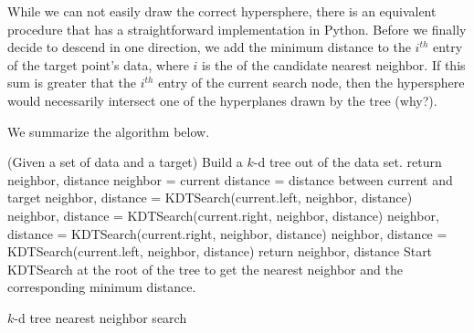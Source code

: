 While we can not easily draw the correct hypersphere, there is an equivalent procedure that has a straightforward implementation in Python.
Before we finally decide to descend in one direction, we add the minimum distance to the $i^{th}$ entry of the target point's data, where $i$ is the  of the candidate nearest neighbor.
If this sum is greater that the $i^{th}$ entry of the current search node, then the hypersphere would necessarily intersect one of the hyperplanes drawn by the tree (why?).

We summarize the algorithm below.

\begin{algorithm}[h] %
\begin{algorithmic}[1]
\State (Given a set of data and a target)
\State Build a $k$-d tree out of the data set.
    \State return neighbor, distance
\EndIf
		\State neighbor = current
		\State distance = distance between current and target
	\EndIf
    	\State neighbor, distance = KDTSearch(current.left, neighbor, distance)
    		\State neighbor, distance = KDTSearch(current.right, neighbor, distance)
    	\EndIf
    	\State neighbor, distance = KDTSearch(current.right, neighbor, distance)
    		\State neighbor, distance = KDTSearch(current.left, neighbor, distance)
    	\EndIf
    \EndIf
\State return neighbor, distance
\EndProcedure
\State Start KDTSearch at the root of the tree to get the nearest neighbor and the corresponding minimum distance.
\end{algorithmic}
\caption{$k$-d tree nearest neighbor search}
\label{alg:kdneighborz}
\end{algorithm}


